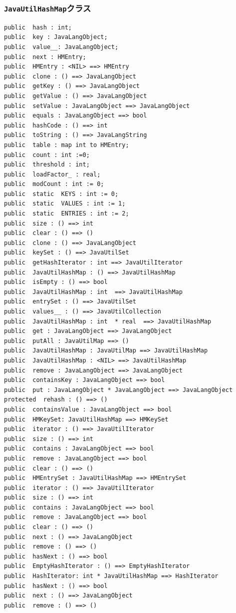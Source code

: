 \documentclass[\pformat,12pt]{jarticle}
\begin{document}
\subsubsection{\texttt{JavaUtilHashMap}クラス}
\begin{small}
\begin{verbatim}
public  hash : int;
public  key : JavaLangObject;
public  value__: JavaLangObject;
public  next : HMEntry;
public  HMEntry : <NIL> ==> HMEntry
public  clone : () ==> JavaLangObject
public  getKey : () ==> JavaLangObject
public  getValue : () ==> JavaLangObject
public  setValue : JavaLangObject ==> JavaLangObject
public  equals : JavaLangObject ==> bool
public  hashCode : () ==> int
public  toString : () ==> JavaLangString
public  table : map int to HMEntry;
public  count : int :=0;
public  threshold : int;
public  loadFactor_ : real;
public  modCount : int := 0;
public  static  KEYS : int := 0;
public  static  VALUES : int := 1;
public  static  ENTRIES : int := 2;
public  size : () ==> int
public  clear : () ==> ()
public  clone : () ==> JavaLangObject
public  keySet : () ==> JavaUtilSet
public  getHashIterator : int ==> JavaUtilIterator
public  JavaUtilHashMap : () ==> JavaUtilHashMap
public  isEmpty : () ==> bool
public  JavaUtilHashMap : int  ==> JavaUtilHashMap
public  entrySet : () ==> JavaUtilSet
public  values__ : () ==> JavaUtilCollection
public  JavaUtilHashMap : int  * real  ==> JavaUtilHashMap
public  get : JavaLangObject ==> JavaLangObject
public  putAll : JavaUtilMap ==> ()
public  JavaUtilHashMap : JavaUtilMap ==> JavaUtilHashMap
public  JavaUtilHashMap : <NIL> ==> JavaUtilHashMap
public  remove : JavaLangObject ==> JavaLangObject
public  containsKey : JavaLangObject ==> bool
public  put : JavaLangObject * JavaLangObject ==> JavaLangObject
protected  rehash : () ==> ()
public  containsValue : JavaLangObject ==> bool
public  HMKeySet: JavaUtilHashMap ==> HMKeySet
public  iterator : () ==> JavaUtilIterator
public  size : () ==> int
public  contains : JavaLangObject ==> bool
public  remove : JavaLangObject ==> bool
public  clear : () ==> ()
public  HMEntrySet : JavaUtilHashMap ==> HMEntrySet
public  iterator : () ==> JavaUtilIterator
public  size : () ==> int
public  contains : JavaLangObject ==> bool
public  remove : JavaLangObject ==> bool
public  clear : () ==> ()
public  next : () ==> JavaLangObject
public  remove : () ==> ()
public  hasNext : () ==> bool
public  EmptyHashIterator : () ==> EmptyHashIterator
public  HashIterator: int * JavaUtilHashMap ==> HashIterator
public  hasNext : () ==> bool
public  next : () ==> JavaLangObject
public  remove : () ==> ()
\end{verbatim}
\end{small}
\end{document}
